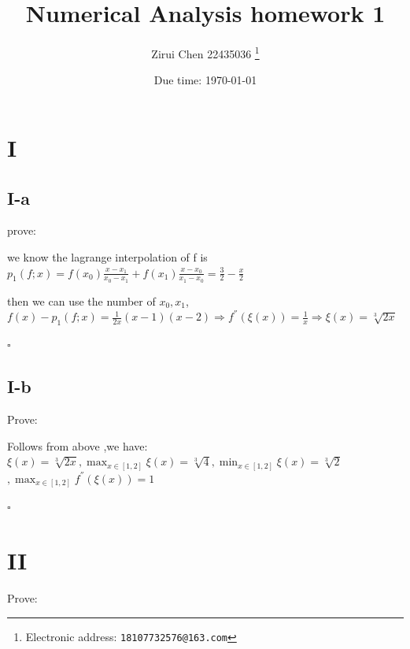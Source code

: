 \documentclass[a4paper]{article}
\begin{document}
\title{Numerical Analysis homework 1}

\author{Zirui Chen 22435036
  \thanks{Electronic address: \texttt{18107732576@163.com}}}


\date{Due time: \today}

\maketitle






\section*{I}

\subsection*{I-a}
prove:

we know the lagrange interpolation of f is 
$p_{1}(f;x)=f(x_{0})\frac{x-x_{1}}{x_{0}-x_{1}}+f({x_{1}})\frac{x-x_{0}}{x_{1}-x_{0}}=\frac{3}{2}-\frac{x}{2}$

then we can use the number of 
$x_{0},x_{1}$,$f(x)-p_{1}(f;x)=\frac{1}{2x}(x-1)(x-2) \Rightarrow f^{''}(\xi(x))=\frac{1}{x} \Rightarrow \xi(x)=\sqrt[3]{2x} $ 
\begin{flushright} %
    $\square$ 
\end{flushright} 
\subsection*{I-b}
Prove:

Follows from above ,we have:
$\xi(x)=\sqrt[3]{2x} ,\max_{x \in [1,2]} \xi(x)=\sqrt[3]{4} ,\min_{x \in [1,2]} \xi(x)=\sqrt[3]{2} $
$,\max_{x \in [1,2]} f^{''}(\xi(x))=1 $
\begin{flushright} 
    $\square$ 
\end{flushright} 


\section*{II}
Prove:
\end{document}
